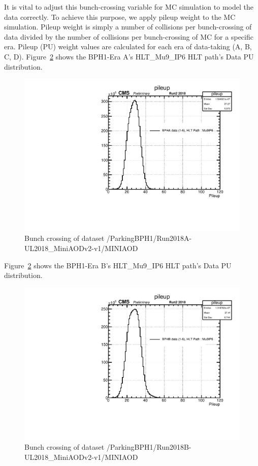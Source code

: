 It is vital to adjust this bunch-crossing variable for MC simulation to model the data correctly.
To achieve this purpose, we apply pileup weight to the MC simulation.
Pileup weight is simply a number of collisions per bunch-crossing of data divided by the number of collisions per bunch-crossing of MC for a specific era.
Pileup (PU) weight values are calculated for each era of data-taking (A, B, C, D).
Figure~\ref{fig:EraAData} shows the BPH1-Era A's HLT\_Mu9\_IP6 HLT path's Data PU distribution.
\begin{figure}[h!]
  \label{fig:EraAData}
  \centering
  \includegraphics[width=0.67\linewidth]{figs/NVtx_BPHA.pdf}
  \caption{Bunch crossing of dataset /ParkingBPH1/Run2018A-UL2018\_MiniAODv2-v1/MINIAOD}

\end{figure}

Figure~\ref{fig:EraAData} shows the BPH1-Era B's HLT\_Mu9\_IP6 HLT path's Data PU distribution.
\begin{figure}[h!]
  \label{fig:EraAData}
  \centering
  \includegraphics[width=0.67\linewidth]{figs/NVtx_BPHB.pdf}
  \caption{Bunch crossing of dataset /ParkingBPH1/Run2018B-UL2018\_MiniAODv2-v1/MINIAOD}

\end{figure}

